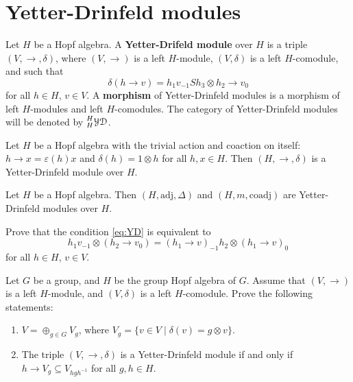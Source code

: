 \section{Yetter-Drinfeld modules}

\begin{definition}
Let $H$ be a Hopf algebra. A \textbf{Yetter-Drifeld module} over $H$ is a
triple $(V,\rightarrow,\delta)$, where $(V,\rightarrow)$ is a left $H$-module,
$(V,\delta)$ is a left $H$-comodule, and such that 
\begin{equation}
\delta(h\rightarrow v)=h_{1}v_{-1}Sh_{3}\otimes h_{2}\rightarrow v_{0}\label{eq:YD}
\end{equation}
for all $h\in H$, $v\in V$. A \textbf{morphism} of Yetter-Drinfeld modules
is a morphism of left $H$-modules and left $H$-comodules. The category of Yetter-Drinfeld
modules will be denoted by $\prescript{H}{H}{\mathcal{YD}}$.
\end{definition}

\begin{example}
Let $H$ be a Hopf algebra with the trivial action and coaction on itself:
$h\rightarrow x=\varepsilon(h)x$ and $\delta(h)=1\otimes h$ for all $h,x\in H$.
Then $(H,\rightarrow,\delta)$ is a Yetter-Drinfeld module over $H$.
\end{example}

\begin{example}
Let $H$ be a Hopf algebra. Then $(H,\mathrm{adj},\Delta)$ and
$(H,m,\mathrm{coadj})$ are Yetter-Drinfeld modules over $H$.
\end{example}

\begin{exercise}
\label{exercise:YD_condition}
Prove that the condition \eqref{eq:YD} is equivalent to
\begin{equation}
\label{eq:left_left_YD_equivalent}
h_{1}v_{-1}\otimes(h_{2}\rightarrow v_{0})=(h_{1}\rightarrow v)_{-1}h_{2}\otimes(h_{1}\rightarrow v)_{0}
\end{equation}
for all $h\in H$, $v\in V$.
\end{exercise}

\begin{exercise}
Let $G$ be a group, and $H$ be the group Hopf algebra of $G$. Assume that
$(V,\rightarrow)$ is a left $H$-module, and $(V,\delta)$ is a left
$H$-comodule. Prove the following statements:
\begin{enumerate}
\item $V=\oplus_{g\in G}V_{g}$, where $V_{g}=\{v\in V\mid\delta(v)=g\otimes v\}$.  
\item The triple $(V,\rightarrow,\delta)$ is a Yetter-Drinfeld
module if and only if $h\rightarrow V_{g}\subseteq V_{hgh^{-1}}$ for all
$g,h\in H$.
\end{enumerate}
\end{exercise}

